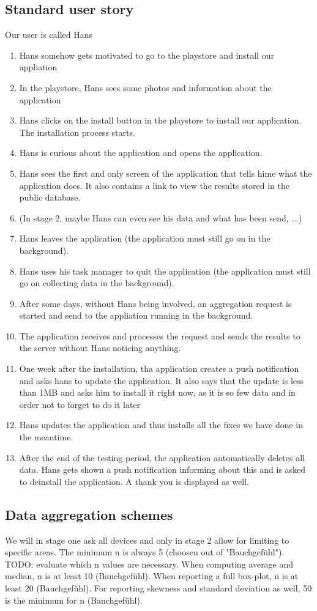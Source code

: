 \subsection{Standard user story}
Our user is called Hans
\begin{enumerate}
	\item Hans somehow gets motivated to go to the playstore and install our appliation
	\item In the playstore, Hans sees some photos and information about the application
	\item Hans clicks on the install button in the playstore to install our application. The installation process starts.
	\item Hans is curious about the application and opens the application.
	\item Hans sees the first and only screen of the application that tells hime what the application does. It also contains a link to view the results stored in the public database.
	\item (In stage 2, maybe Hans can even see his data and what has been send, ...)
	\item Hans leaves the application (the application must still go on in the background).
	\item Hans uses his task manager to quit the application (the application must still go on collecting data in the background).
	\item After some days, without Hans being involved, an aggregation request is started and send to the appliation running in the background.
	\item The application receives and processes the request and sends the results to the server without Hans noticing anything.
	\item One week after the installation, tha application creates a push notification and asks hans to update the application. It also says that the update is less than 1MB and asks him to install it right now, as it is so few data and in order not to forget to do it later
	\item Hans updates the application and thus installs all the fixes we have done in the meantime.
	\item After the end of the testing period, the application automatically deletes all data. Hans gets shown a push notification informing about this and is asked to deinstall the application. A thank you is displayed as well.
\end{enumerate}

\subsection{Data aggregation schemes}
We will in stage one ask all devices and only in stage 2 allow for limiting to specific areas. The minimum n is always 5 (choosen out of "Bauchgefühl").
TODO: evaluate which n values are necessary.
When computing average and median, n is at least 10 (Bauchgefühl).
When reporting a full box-plot, n is at least 20 (Bauchgefühl). 
For reporting skewness and standard deviation as well, 50 is the minimum for n (Bauchgefühl).

